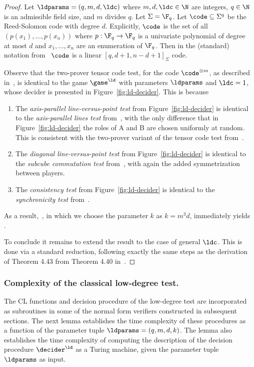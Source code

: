 \begin{proof}
Let $\ldparams = (q, m, d, \ldc)$
where $m, d, \ldc \in \N$ are integers, $q \in \N$ is an admissible field size,
and $m$ divides $q$. Let $\Sigma=\F_q$. Let $\code \subseteq \Sigma^q$ be the Reed-Solomon code with degree $d$. Explicitly, $\code$ is the set of all $(p(x_1),\ldots,p(x_n))$ where $p:\F_q\to\F_q$ is a univariate polynomial of degree at most $d$ and $x_1,\ldots,x_n$ are an enumeration of $\F_q$. Then in the (standard) notation from~\cite{ji2021quantum} $\code$ is a linear $[q,d+1,n-d+1]_\Sigma$ code.

Observe that the two-prover tensor code test, for the code $\code^{\otimes m}$, as described in~\cite[Figure 1 and Figure 2]{ji2021quantum}, is identical to the game $\game^\ld$ with parameters $\ldparams$ and $\ldc=1$, whose decider is presented in Figure~\ref{fig:ld-decider}. This is because 
\begin{enumerate}
\item The \emph{axis-parallel line-versus-point test} from Figure~\ref{fig:ld-decider} is identical to the \emph{axis-parallel lines test} from~\cite[Figure 1]{ji2021quantum}, with the only difference that in Figure~\ref{fig:ld-decider} the roles of A and B are chosen uniformly at random. This is consistent with the two-prover variant of the tensor code test from~\cite[Section 4.1]{ji2021quantum}.
\item The \emph{diagonal line-versus-point test} from Figure~\ref{fig:ld-decider} is identical to the \emph{subcube commutation test} from~\cite[Figure 1]{ji2021quantum}, with again the added symmetrization between players. 
\item The \emph{consistency test} from Figure~\ref{fig:ld-decider} is identical to the \emph{synchronicity test} from~\cite[Figure 2]{ji2021quantum}.
\end{enumerate}

As a result,~\cite[Theorem 4.7]{ji2021quantum}, in which we choose the parameter $k$ as $k=m^3d$,  immediately yields .

To conclude it remains to extend the result to the case of general $\ldc$. This is done 
via a standard reduction, following exactly the same steps as the derivation of Theorem 4.43 from Theorem 4.40 in~\cite{NW19}.
\end{proof}






\subsubsection{Complexity of the classical low-degree test.}
The CL functions and decision procedure of the low-degree test are incorporated
as subroutines in some of the normal form verifiers constructed in subsequent
sections.
The next lemma establishes the time complexity of these procedures as a function
of the parameter tuple $\ldparams = (q,m,d,k)$.
The lemma also establishes the time complexity of computing the {description} of
the decision procedure $\decider^\ld$ as a Turing machine, given the parameter
tuple $\ldparams$ as input.



